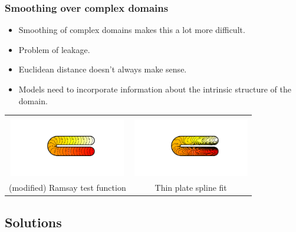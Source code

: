 \documentclass[ignorenonframetext]{beamer} %
\newcommand{\bc}{\begin{center}}
\newcommand{\ec}{\end{center}}
\newcommand{\bi}{\begin{itemize}}
\newcommand{\ei}{\end{itemize}}
\begin{document}
\begin{frame}
	\frametitle{Smoothing over complex domains}
       \bi
         \item Smoothing of complex domains makes this a lot more difficult.
         \item Problem of leakage.
         \item Euclidean distance doesn't always make sense.
         \item Models need to incorporate information about the intrinsic structure of the domain.
       \ei
       \bc\begin{tabular}{@{}cc}
          & \\
          \includegraphics[width=2in, trim=1in 1in 1in 1in]{figs/ramsayhorseshoe} & \includegraphics[width=2in, trim=1in 1in 1in 1in]{figs/leakageexample}\\
          (modified) Ramsay test function & Thin plate spline fit\\
       \end{tabular}\ec
\end{frame}

\subsection{Solutions}
\end{document}
